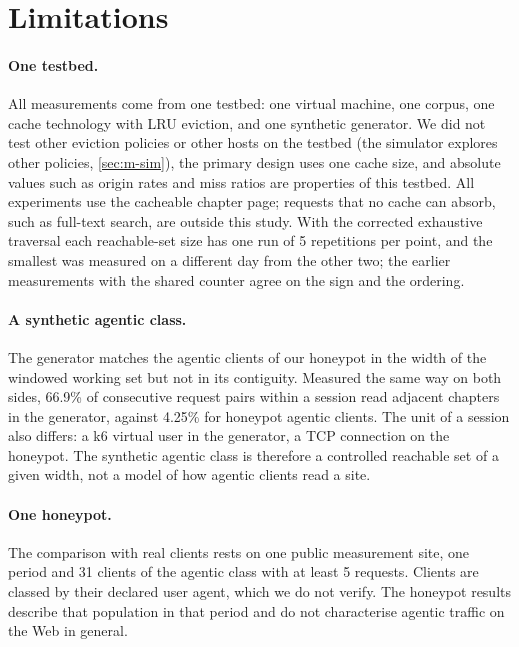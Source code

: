 \section{Limitations}\label{sec:limitations}

\paragraph{One testbed.}
All measurements come from one testbed: one virtual machine, one corpus, one cache
technology with LRU eviction, and one synthetic generator.
We did not test other eviction policies or other hosts on the testbed (the simulator
explores other policies, \cref{sec:m-sim}), the primary design uses one cache size, and absolute values such as origin rates and miss ratios are properties of this
testbed.
All experiments use the cacheable chapter page; requests that no cache can absorb, such as
full-text search, are outside this study.
With the corrected exhaustive traversal each reachable-set size has one run of 5
repetitions per point, and
the smallest was measured on a different day from the other two; the earlier measurements
with the shared counter agree on the sign and the ordering.

\paragraph{A synthetic agentic class.}
The generator matches the agentic clients of our honeypot in the width of the windowed
working set but not in its contiguity.
Measured the same way on both sides, 66.9\% of consecutive request pairs within a session
read adjacent chapters in the generator, against 4.25\% for honeypot agentic
clients.
The unit of a session also differs: a k6 virtual user in the generator, a TCP connection
on the honeypot.
The synthetic agentic class is therefore a controlled reachable set of a given width, not a
model of how agentic clients read a site.

\paragraph{One honeypot.}
The comparison with real clients rests on one public measurement site, one period and 31
clients of the agentic class with at least 5 requests.
Clients are classed by their declared user agent, which we do not verify.
The honeypot results describe that population in that period and do not characterise
agentic traffic on the Web in general.

